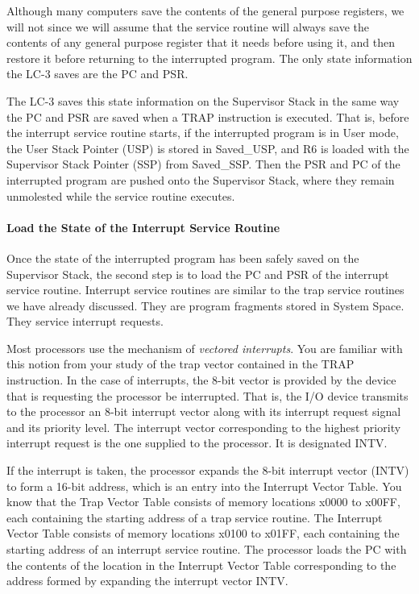 \documentclass{patt}
\begin{document}
Although many computers save the contents of the general purpose
registers, we will not since we will assume that the service routine 
will always save the contents of any general purpose register that
it needs before using it, and then restore it before returning to the 
interrupted program.  The only state information the LC-3 saves are
the PC and PSR.

The LC-3 saves this state information on the 
Supervisor Stack in the same way the PC and PSR are saved when a TRAP
instruction is executed.  That is, before the interrupt service routine starts, 
if the interrupted program is in User mode, the User Stack Pointer (USP) is
stored in Saved\_USP, and R6 is loaded with the Supervisor Stack Pointer (SSP)
from Saved\_SSP.  Then the PSR and PC of
the interrupted program are pushed onto the Supervisor Stack, where
they remain unmolested while the service routine executes.

\paragraph{Load the State of the Interrupt Service Routine}
Once the state of the interrupted program has been safely saved on the
Supervisor Stack, the second step is to load the PC and PSR of the
interrupt service routine. Interrupt service routines are similar to
the trap service routines we have already discussed.  They are program
fragments stored in System Space.  They service interrupt requests.

Most processors use the mechanism of \textit{vectored interrupts}. You
are familiar with this notion from your study of the trap vector
contained in the TRAP instruction. In the case of interrupts, the
8-bit vector is provided by the device that is requesting the
processor be interrupted. That is, the I/O device transmits to the
processor an 8-bit interrupt vector along with its interrupt request
signal and its priority level. The interrupt vector corresponding to
the highest priority interrupt request is the one supplied to the
processor. It is designated INTV. 

If the interrupt is taken, the
processor expands the 8-bit interrupt vector (INTV) to form a 16-bit
address, which is an entry into the Interrupt Vector Table.  You know 
that the Trap Vector Table consists of memory locations x0000 to x00FF, 
each containing the starting address of a trap service
routine. The Interrupt Vector Table consists of memory locations x0100
to x01FF, each containing the starting address of an interrupt service
routine. The processor loads the PC with the contents of the location in
the Interrupt Vector Table corresponding to the address formed by expanding 
the interrupt vector INTV.
\end{document}
